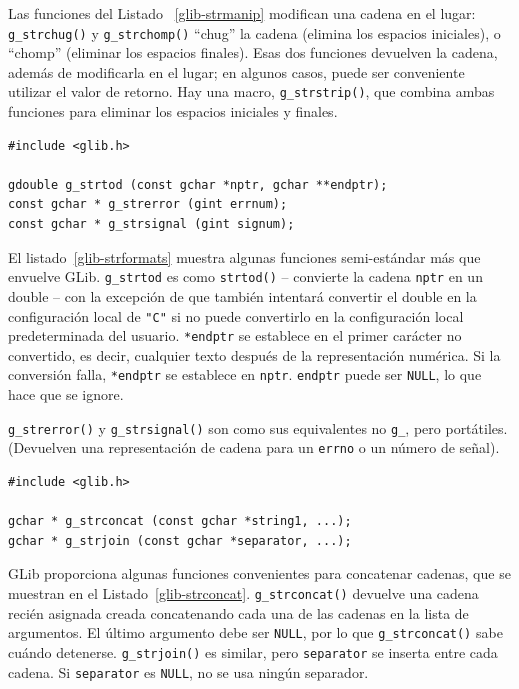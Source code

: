 Las funciones del Listado ~\ref{glib-strmanip} modifican una cadena en el lugar: \lstinline{g_strchug()} y \lstinline{g_strchomp()} ``chug'' la cadena (elimina los espacios iniciales), o ``chomp'' (eliminar los espacios finales). Esas dos funciones devuelven la cadena, además de modificarla en el lugar; en algunos casos, puede ser conveniente utilizar el valor de retorno. Hay una macro, \lstinline{g_strstrip()}, que combina ambas funciones para eliminar los espacios iniciales y finales.

\begin{lstlisting}[style=GLib/GTK, caption={Conversiones de cadenas}, label=glib-strformats]
#include <glib.h>

gdouble g_strtod (const gchar *nptr, gchar **endptr);
const gchar * g_strerror (gint errnum);
const gchar * g_strsignal (gint signum);
\end{lstlisting}

El listado~\ref{glib-strformats} muestra algunas funciones semi-estándar más que envuelve GLib. \lstinline{g_strtod} es como \lstinline{strtod()} -- convierte la cadena \lstinline{nptr} en un double -- con la excepción de que también intentará convertir el double en la configuración local de \lstinline{"C"} si no puede convertirlo en la configuración local predeterminada del usuario. \lstinline{*endptr} se establece en el primer carácter no convertido, es decir, cualquier texto después de la representación numérica. Si la conversión falla, \lstinline{*endptr} se establece en \lstinline{nptr}. \lstinline{endptr} puede ser \lstinline{NULL}, lo que hace que se ignore.

\lstinline{g_strerror()} y \lstinline{g_strsignal()} son como sus equivalentes no \lstinline{g_}, pero portátiles. (Devuelven una representación de cadena para un \lstinline{errno} o un número de señal).

\begin{lstlisting}[style=GLib/GTK, caption={Concatenar cadenas}, label=glib-strconcat]
#include <glib.h>

gchar * g_strconcat (const gchar *string1, ...);
gchar * g_strjoin (const gchar *separator, ...);
\end{lstlisting}

GLib proporciona algunas funciones convenientes para concatenar cadenas, que se muestran en el Listado~\ref{glib-strconcat}. \lstinline{g_strconcat()} devuelve una cadena recién asignada creada concatenando cada una de las cadenas en la lista de argumentos. El último argumento debe ser \lstinline{NULL}, por lo que \lstinline{g_strconcat()} sabe cuándo detenerse. \lstinline{g_strjoin()} es similar, pero \lstinline{separator} se inserta entre cada cadena. Si \lstinline {separator} es \lstinline{NULL}, no se usa ningún separador.

